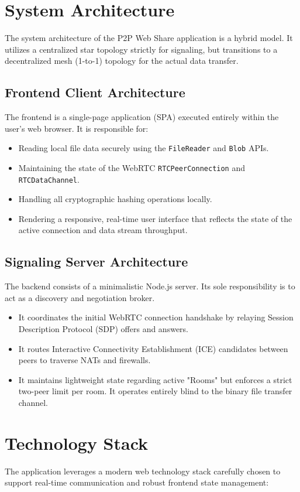 \documentclass[12pt, a4paper]{article}
\begin{document}
\section{System Architecture}
The system architecture of the P2P Web Share application is a hybrid model. It utilizes a centralized star topology strictly for signaling, but transitions to a decentralized mesh (1-to-1) topology for the actual data transfer. 

\subsection{Frontend Client Architecture}
The frontend is a single-page application (SPA) executed entirely within the user's web browser. It is responsible for:
\begin{itemize}
    \item Reading local file data securely using the \texttt{FileReader} and \texttt{Blob} APIs.
    \item Maintaining the state of the WebRTC \texttt{RTCPeerConnection} and \texttt{RTCDataChannel}.
    \item Handling all cryptographic hashing operations locally.
    \item Rendering a responsive, real-time user interface that reflects the state of the active connection and data stream throughput.
\end{itemize}

\subsection{Signaling Server Architecture}
The backend consists of a minimalistic Node.js server. Its sole responsibility is to act as a discovery and negotiation broker.
\begin{itemize}
    \item It coordinates the initial WebRTC connection handshake by relaying Session Description Protocol (SDP) offers and answers.
    \item It routes Interactive Connectivity Establishment (ICE) candidates between peers to traverse NATs and firewalls.
    \item It maintains lightweight state regarding active "Rooms" but enforces a strict two-peer limit per room. It operates entirely blind to the binary file transfer channel.
\end{itemize}

\section{Technology Stack}
The application leverages a modern web technology stack carefully chosen to support real-time communication and robust frontend state management:
\end{document}
